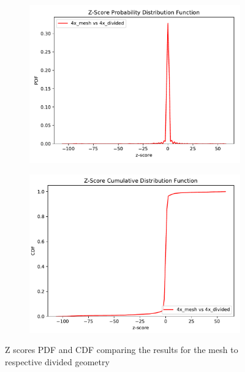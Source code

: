 \begin{figure}
	\begin{subfigure}[t]{0.5\textwidth}
		\includegraphics[width=\linewidth, trim={0cm 0cm 0cm 0.9cm},clip]{../figs/toy_p2/PDF_zscore_VPII_4xm_4xs.pdf}
		\label{fig:2dose_4x_split}
	\end{subfigure}\hfill
	\begin{subfigure}[t]{0.5\textwidth}
		\includegraphics[width=\linewidth, trim={0cm 0cm 0cm 0.8cm},clip]{../figs/toy_p2/CDF_zscore_VPII_4xm_4xs.pdf}
		\label{fig:2dose_4x_mesh}
	\end{subfigure}
	\caption{Z scores PDF and CDF comparing the results for the mesh to respective divided geometry }
	\label{fig:2z_score}
\end{figure}
\newpage
